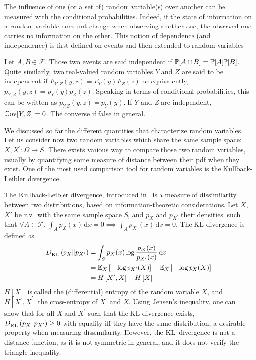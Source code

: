 \documentclass[../../Main_ManuscritThese.tex]{subfiles}
\begin{document}
The influence of one (or a set of) random variable(s) over another can
be measured with the conditional probabilities. Indeed, if the state
of information on a random variable does not change when observing
another one, the observed one carries no information on the
other. This notion of dependence (and independence) is first defined
on events and then extended to random variables
\begin{definition}[Independence]
  Let $A,B\in \mathcal{F}$. Those two events are said independent if
  $\mathbb{P}[A \cap B] = \mathbb{P}[A]\mathbb{P}[B]$.  Quite similarly, two
  real-valued random variables $Y$ and $Z$ are said to be independent
  if $F_{Y,Z}(y,z) = F_Y(y) F_Z(z)$ or equivalently,
  $p_{Y,Z}(y,z) = p_Y(y) p_Z(z)$.  Speaking in terms of conditional
  probabilities, this can be written as $p_{Y|Z}(y,z) = p_{Y}(y)$.  If
  $Y$ and $Z$ are independent, $\mathbb{C}\mathrm{ov}[Y, Z] = 0$. The converse if false
  in general.
\end{definition}

We discussed so far the different quantities that characterize random
variables. Let us consider now two random variables which share the
same sample space: $X, X^{\prime}: \Omega \rightarrow S$. There exists
various way to compare those two random variables, usually by
quantifying some measure of distance between their pdf when they
exist. One of the most used comparison tool for random variables is
the Kullback-Leibler divergence.

\begin{definition}
   \label{def:KL_entropy}
   The Kullback-Leibler divergence, introduced
   in~\cite{kullback_information_1951} is a measure of dissimilarity
   between two distributions, based on information-theoretic
   considerations.  Let $X$, $X'$ be r.v.\ with the same sample space
   $S$, and $p_X$ and $p_{X^{\prime}}$ their densities, such that
   $\forall A\in\mathcal{F}$,
   $\int_A p_X(x)\,\mathrm{d}x = 0 \implies \int_A
   p_{X^{\prime}}(x)\,\mathrm{d}x =0$. The KL-divergence is defined as
  \begin{align}
    D^{\mathrm{}}_{\mathrm{KL}}\left(p_X \| p_{X^\prime}\right) &= \int_{S} p_X(x) \log \frac{p_X(x)}{p_{X^\prime}(x)} \,\mathrm{d}x \\ &= \mathbb{E}_X\left[-\log p_{X^\prime}(X)\right] - \mathbb{E}_X\left[-\log p_X(X)\right] \\
                                                                                                &= H\left[X^{\prime}, X\right] - H\left[X\right]
  \end{align}
  $H[X]$ is called the (differential) entropy of the random variable
  $X$, and $H[X^{\prime}, X]$ the cross-entropy of $X^{\prime}$ and
  $X$.  Using Jensen's inequality, one can show that for all $X$ and
  $X^{\prime}$ such that the KL-divergence exists,
  $D^{\mathrm{}}_{\mathrm{KL}}\left(p_X \| p_{X^{\prime}}\right)\geq 0$ with equality iff they have the
  same distribution, a desirable property when measuring
  dissimilarity. However, the KL--divergence is not a distance
  function, as it is not symmetric in general, and it does not verify
  the triangle inequality.
\end{definition}
\end{document}
